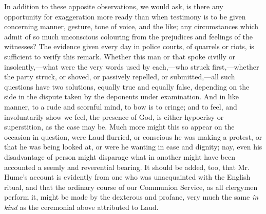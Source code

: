 In addition to these apposite observations, we
would ask, is there any opportunity for exaggeration more ready than
when testimony is to be given concerning manner, gesture, tone of voice,
and the like; any circumstances which admit of so much unconscious
colouring from the prejudices and feelings of the witnesses? The
evidence given every day in police courts, of quarrels or riots, is
sufficient to verify this remark. Whether this man or that spoke civilly
or insolently,—what were the very words used by each,—who struck
first,—whether the party struck, or shoved, or passively repelled, or
submitted,—all such questions have two solutions, equally true and
equally false, depending on the side in the dispute taken by the
deponents under examination. And in like manner, to a rude and scornful
mind, to bow is to cringe; and to feel, and involuntarily show we feel,
the presence of God, is either hypocrisy or superstition, as the case
may be. Much more might this so appear on the occasion in question, were
Laud flurried, or conscious he was making a protest, or that he was
being looked at, or were he wanting in ease and dignity; nay, even his
disadvantage of person might disparage what in another might have been
accounted a seemly and reverential bearing. It should be added, too,
that Mr. Hume's account is evidently from one who was unacquainted with
the English ritual, and that the ordinary course of our Communion
Service, as all clergymen perform it, might be made by the dexterous and
profane, very much the same \emph{in kind} as the ceremonial above
attributed to Laud.

